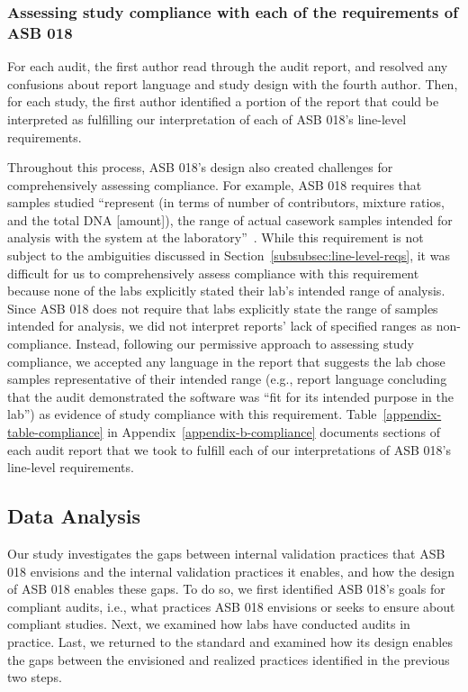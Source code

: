 \subsubsection{Assessing study compliance with each of the requirements of ASB 018} 
For each audit, the first author read through the audit report, and resolved any confusions about report language and study design with the fourth author. Then, for each study, the first author identified a portion of the report that could be interpreted as fulfilling our interpretation of each of ASB 018's line-level requirements. 

Throughout this process, ASB 018's design also created challenges for comprehensively assessing compliance. For example, ASB 018 requires that samples studied ``represent (in terms of number of contributors, mixture ratios, and the total DNA [amount]), the range of actual casework samples intended for analysis with the system at the laboratory''~\cite{asb018}. While this requirement is not subject to the ambiguities discussed in Section~\ref{subsubsec:line-level-reqs}, it was difficult for us to comprehensively assess compliance with this requirement because none of the labs explicitly stated their lab's intended range of analysis. Since ASB 018 does not require that labs explicitly state the range of samples intended for analysis, we did not interpret reports' lack of specified ranges as non-compliance. Instead, following our permissive approach to assessing study compliance, we accepted any language in the report that suggests the lab chose samples representative of their intended range (e.g., report language concluding that the audit demonstrated the software was ``fit for its intended purpose in the lab'') as evidence of study compliance with this requirement. Table~\ref{appendix-table-compliance} in Appendix~\ref{appendix-b-compliance} documents sections of each audit report that we took to fulfill each of our interpretations of ASB 018's line-level requirements.


\subsection{Data Analysis}
\label{sec:methods-data-analysis}
Our study investigates the gaps between internal validation practices that ASB 018 envisions and the internal validation practices it enables, and how the design of ASB 018 enables these gaps. To do so, we first identified ASB 018's goals for compliant audits, i.e., what practices ASB 018 envisions or seeks to ensure about compliant studies. Next, we examined how labs have conducted audits in practice. Last, we returned to the standard and examined how its design enables the gaps between the envisioned and realized practices identified in the previous two steps.


